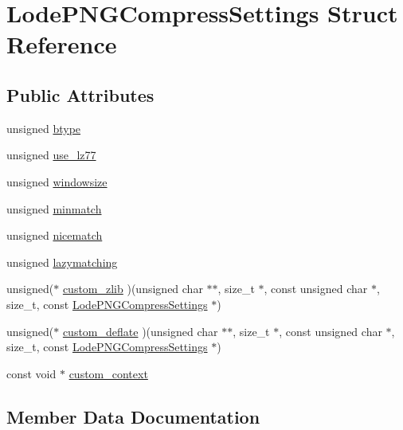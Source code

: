 \hypertarget{struct_lode_p_n_g_compress_settings}{}\section{Lode\+P\+N\+G\+Compress\+Settings Struct Reference}
\label{struct_lode_p_n_g_compress_settings}
\subsection*{Public Attributes}
\begin{DoxyCompactItemize}
\item 
unsigned \mbox{\hyperlink{struct_lode_p_n_g_compress_settings_ac0afeac7276cce01fa9824aa2d5a1ba9}{btype}}
\item 
unsigned \mbox{\hyperlink{struct_lode_p_n_g_compress_settings_a37a87bd874376f0298efad2870e70e7e}{use\+\_\+lz77}}
\item 
unsigned \mbox{\hyperlink{struct_lode_p_n_g_compress_settings_a01e77a9db5c2c4dfe6c79bf04f0bf84e}{windowsize}}
\item 
unsigned \mbox{\hyperlink{struct_lode_p_n_g_compress_settings_a11d89e0ff0c57f1c49dd58cb8347e005}{minmatch}}
\item 
unsigned \mbox{\hyperlink{struct_lode_p_n_g_compress_settings_a70bc37e21eeffead6e9c8d67e163a591}{nicematch}}
\item 
unsigned \mbox{\hyperlink{struct_lode_p_n_g_compress_settings_ad4ffde429dee40a8c314016f5f6fdab5}{lazymatching}}
\item 
unsigned($\ast$ \mbox{\hyperlink{struct_lode_p_n_g_compress_settings_a4a7835f394349f15f1302d11bcb0efa0}{custom\+\_\+zlib}} )(unsigned char $\ast$$\ast$, size\+\_\+t $\ast$, const unsigned char $\ast$, size\+\_\+t, const \mbox{\hyperlink{struct_lode_p_n_g_compress_settings}{Lode\+P\+N\+G\+Compress\+Settings}} $\ast$)
\item 
unsigned($\ast$ \mbox{\hyperlink{struct_lode_p_n_g_compress_settings_a55dafebbbe017806fb2bbc32bb40a59b}{custom\+\_\+deflate}} )(unsigned char $\ast$$\ast$, size\+\_\+t $\ast$, const unsigned char $\ast$, size\+\_\+t, const \mbox{\hyperlink{struct_lode_p_n_g_compress_settings}{Lode\+P\+N\+G\+Compress\+Settings}} $\ast$)
\item 
const void $\ast$ \mbox{\hyperlink{struct_lode_p_n_g_compress_settings_a62826645ef28e2a84dd2b65f547a2883}{custom\+\_\+context}}
\end{DoxyCompactItemize}


\subsection{Member Data Documentation}
\mbox{\label{struct_lode_p_n_g_compress_settings_ac0afeac7276cce01fa9824aa2d5a1ba9}} 
